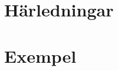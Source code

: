 \documentclass[12pt, a4paper]{article}
\theoremstyle{definition}
\begin{document}
    

    \newpage
    \appendix
    \section{Härledningar}
    \label{appendix:härledning}
    
    \section{Exempel}
    \label{appendix:exempel}
\end{document}
